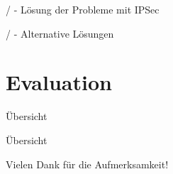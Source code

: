 \documentclass{beamer}
\begin{document}
\begin{frame}{}{\secname/\subsecname}
- Lösung der Probleme mit IPSec\\
\end{frame}

\begin{frame}{}{\secname/\subsecname}
- Alternative Lösungen
\end{frame}

\section{Evaluation}

\begin{frame}{Übersicht}
\tableofcontents[sectionstyle=show/shaded, subsectionstyle=show/hide/hide]
\end{frame}

\begin{frame}{\secname}{\subsecname}
\end{frame}




\begin{frame}[plain]{Übersicht}
	\tableofcontents[sectionstyle=show/show, subsectionstyle=show/hide/hide]
\begin{center}
Vielen Dank für die Aufmerksamkeit!
\end{center}
\end{frame}



{\tiny


}

\end{document}

